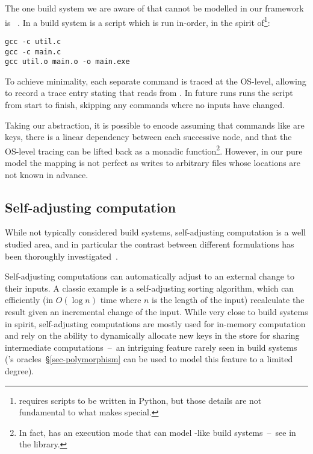 The one build system we are aware of that cannot be modelled in our framework is
\Fabricate~\cite{fabricate}. In \Fabricate a build system is a script which is
run in-order, in the spirit of\footnote{\Fabricate requires scripts to be
written in Python, but those details are not fundamental to what makes
\Fabricate special.}:

\begin{verbatim}
gcc -c util.c
gcc -c main.c
gcc util.o main.o -o main.exe
\end{verbatim}

\noindent
To achieve minimality, each separate command is traced at the OS-level, allowing
\Fabricate to record a trace entry stating that  reads from
. In future runs \Fabricate runs the script from start to finish,
skipping any commands where no inputs have changed.

Taking our abstraction, it is possible to encode \Fabricate assuming that
commands like  are keys, there is a linear dependency between
each successive node, and that the OS-level tracing can be lifted back as a
monadic  function\footnote{In fact, \Shake has an execution mode that
can model \Fabricate{}-like build systems~--~see 
in the \Shake library.}. However, in our pure model the mapping is not perfect
as  writes to arbitrary files whose locations are not known in advance.

\subsection{Self-adjusting computation}

While not typically considered build systems, self-adjusting computation is a
well studied area, and in particular the contrast between different formulations
has been thoroughly investigated~\cite{acar2007selfadjusting}.

Self-adjusting computations can automatically adjust to an external change
to their inputs. A classic example is a self-adjusting sorting algorithm, which
can efficiently (in $O(\log{n})$ time where $n$ is the length of the input)
recalculate the result given an incremental change of the input. While very
close to build systems in spirit, self-adjusting computations are mostly used
for in-memory computation and rely on the ability to dynamically allocate new
keys in the store for sharing intermediate computations~--~an intriguing feature
rarely seen in build systems (\Shake's oracles~\S\ref{sec-polymorphism} can be
used to model this feature to a limited degree).

